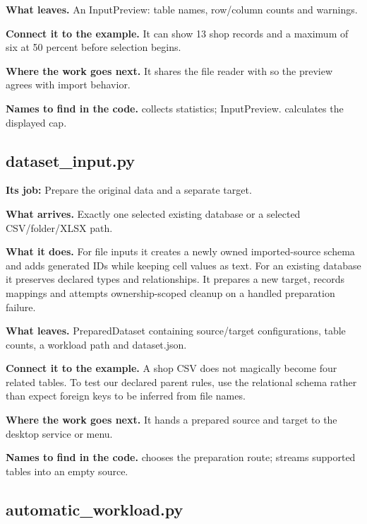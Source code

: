 \textbf{What leaves.} An InputPreview: table names, row/column counts and warnings.

\textbf{Connect it to the example.} It can show 13 shop records and a maximum of six at 50 percent before selection begins.

\textbf{Where the work goes next.} It shares the file reader with  so the preview agrees with import behavior.

\textbf{Names to find in the code.}  collects statistics; InputPreview. calculates the displayed cap.


\subsection{dataset\_input.py}

\textbf{Its job:} Prepare the original data and a separate target.

\textbf{What arrives.} Exactly one selected existing database or a selected CSV/folder/XLSX path.

\textbf{What it does.} For file inputs it creates a newly owned imported-source schema and adds generated IDs while keeping cell values as text. For an existing database it preserves declared types and relationships. It prepares a new target, records mappings and attempts ownership-scoped cleanup on a handled preparation failure.

\textbf{What leaves.} PreparedDataset containing source/target configurations, table counts, a workload path and dataset.json.

\textbf{Connect it to the example.} A shop CSV does not magically become four related tables. To test our declared parent rules, use the relational schema rather than expect foreign keys to be inferred from file names.

\textbf{Where the work goes next.} It hands a prepared source and target to the desktop service or menu.

\textbf{Names to find in the code.}  chooses the preparation route;  streams supported tables into an empty source.


\subsection{automatic\_workload.py}

